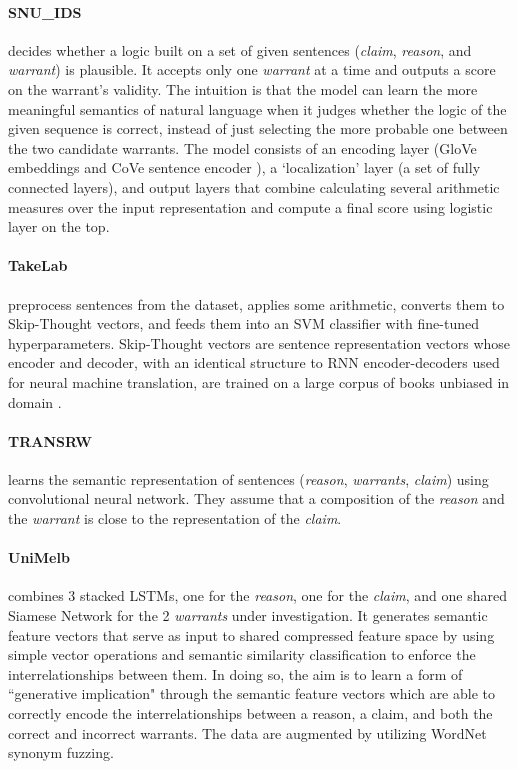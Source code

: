 \paragraph{SNU\_IDS}
decides whether a logic built on a set of given sentences (\emph{claim}, \emph{reason}, and \emph{warrant}) is plausible. It accepts only one \emph{warrant} at a time and outputs a score on the warrant's validity. The intuition is that the model can learn the more meaningful semantics of natural language when it judges whether the logic of the given sequence is correct, instead of just selecting the more probable one between the two candidate warrants. The model consists of an encoding layer (GloVe embeddings \cite{Pennington.2014} and CoVe sentence encoder \cite{McCann.et.al.2017.NIPS}), a `localization' layer (a set of fully connected layers), and output layers that combine calculating several arithmetic measures over the input representation and compute a final score using logistic layer on the top.


\paragraph{TakeLab}
preprocess sentences from the dataset, applies some arithmetic, converts them to Skip-Thought vectors, and feeds them into an SVM classifier with fine-tuned hyperparameters. Skip-Thought vectors are sentence representation vectors whose encoder and decoder, with an identical structure to RNN encoder-decoders used for neural machine translation, are trained on a large corpus of books unbiased in domain \cite{Kiros.et.al.2015}.


\paragraph{TRANSRW}
learns the semantic representation of sentences (\emph{reason}, \emph{warrants}, \emph{claim}) using convolutional neural network. They assume that a composition of the \emph{reason} and the \emph{warrant} is close to the representation of the \emph{claim}.


\paragraph{UniMelb}
combines 3 stacked LSTMs, one for the \emph{reason}, one for the \emph{claim}, and one shared Siamese Network for the 2 \emph{warrants} under investigation. It generates semantic feature vectors that serve as input to shared compressed feature space by using simple vector operations and semantic similarity classification to enforce the interrelationships between them. In doing so, the aim is to learn a form of ``generative implication" through the semantic feature vectors which are able to correctly encode the interrelationships between a reason, a claim, and both the correct and incorrect warrants. The data are augmented by utilizing WordNet synonym fuzzing.


